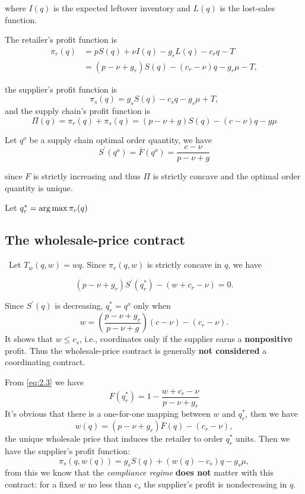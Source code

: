 where $I(q)$ is the expected leftover inventory and $L(q)$ is the lost-sales function.

The retailer's profit function is 
\begin{align*}
    \pi_r(q)&=pS(q)+\nu I(q)-g_r L(q)-c_r q - T\\
    &=(p-\nu+g_r)S(q)-(c_r-\nu)q-g_r\mu-T,
\end{align*}

the supplier's profit function is 
\begin{equation*}
    \pi_s(q)=g_s S(q)-c_s q-g_s\mu + T,
\end{equation*}
and the supply chain's profit function is 
\begin{equation}
    \Pi(q)=\pi_r(q)+\pi_s(q)=(p-\nu+g)S(q)-(c-\nu)q-g\mu
\end{equation}

Let $q^o$ be a supply chain optimal order quantity, we have 
\begin{equation}
    S^\prime(q^o)=\overline F(q^o)=\frac{c-\nu}{p-\nu+g}
\end{equation}

since $F$ is strictly increasing and thus $\Pi$ is strictly concave and the optimal order quantity is unique.

Let $q_r^*=\operatorname*{arg\,max} \pi_r(q)$

\subsection{The wholesale-price contract}\
Let $T_w(q,w)=w q$. Since $\pi_r(q,w)$ is strictly concave in $q$, we have 

\begin{equation}\label{eq:2.3}
    (p-\nu+g_r)S^\prime(q_r^*)-(w+c_r-\nu)=0.
\end{equation}

Since $S^\prime(q)$ is decreasing, $q_r^*=q^o$ only when
$$
w=(\frac{p-\nu+g_r}{p-\nu+g})(c-\nu)-(c_r-\nu).
$$
It shows that $w\leq c_s$, i.e., coordinates only if the supplier earns a \textbf{nonpositive} profit. Thus the wholesale-price contract is generally \textbf{not considered} a coordinating contract.

From \autoref{eq:2.3} we have 
$$F(q_r^*)=1-\frac{w+c_r-\nu}{p-\nu+g_r}$$
It's obvious that there is a one-for-one mapping between $w$ and $q_r^*$, then we have $$w(q)=(p-\nu+g_r)\overline{F}(q)-(c_r-\nu),$$
the unique wholesale price that induces the retailer to order $q_r^*$ units.
Then we have the supplier's profit function:
\begin{equation}
    \pi_s(q,w(q))=g_s S(q)+(w(q)-c_s)q-g_s\mu\label{eq:2.4},
\end{equation}
from this we know that the \textit{compliance regime} \textbf{does not} matter with this contract: for a fixed $w$ no less than $c_s$ the supplier's profit  is nondecreasing in $q$.

